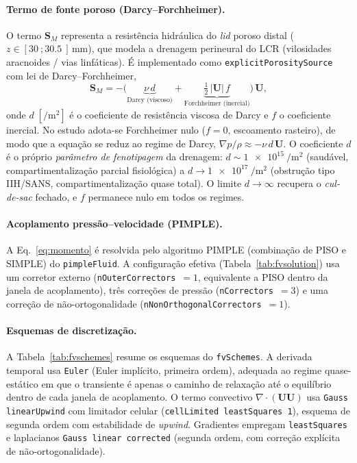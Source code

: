 \paragraph{Termo de fonte poroso (Darcy--Forchheimer).} O termo $\mathbf{S}_M$
representa a resistência hidráulica do \emph{lid} poroso distal
($z \in [\SI{30}{}; \SI{30.5}{}]\,\si{\milli\meter}$), que modela a drenagem
perineural do LCR (vilosidades aracnoides / vias linfáticas). É implementado
como \texttt{explicitPorositySource} com lei de Darcy--Forchheimer,
\begin{equation}
  \mathbf{S}_M
  = -\Big(
      \underbrace{\nu\,d}_{\text{Darcy (viscoso)}}
      + \underbrace{\tfrac{1}{2}\,|\mathbf{U}|\,f}_{\text{Forchheimer (inercial)}}
    \Big)\,\mathbf{U},
  \label{eq:darcy}
\end{equation}
onde $d\;[\si{\per\meter\squared}]$ é o coeficiente de resistência viscosa de
Darcy e $f$ o coeficiente inercial. No estudo adota-se Forchheimer nulo
($f = 0$, escoamento rasteiro), de modo que a equação se reduz ao regime de
Darcy, $\nabla p/\rho \approx -\nu\,d\,\mathbf{U}$. O coeficiente $d$ é o próprio
\emph{parâmetro de fenotipagem} da drenagem: $d \sim \SI{1e15}{\per\meter\squared}$
(saudável, compartimentalização parcial fisiológica) a
$d \to \SI{1e17}{\per\meter\squared}$ (obstrução tipo IIH/SANS,
compartimentalização quase total). O limite $d \to \infty$ recupera o
\emph{cul-de-sac} fechado, e $f$ permanece nulo em todos os regimes.

\paragraph{Acoplamento pressão--velocidade (PIMPLE).} A
Eq.~\eqref{eq:momento} é resolvida pelo algoritmo PIMPLE (combinação de PISO e
SIMPLE) do \texttt{pimpleFluid}. A configuração efetiva
(Tabela~\ref{tab:fvsolution}) usa um corretor externo
(\texttt{nOuterCorrectors}~$=1$, equivalente a PISO dentro da janela de
acoplamento), três correções de pressão (\texttt{nCorrectors}~$=3$) e uma
correção de não-ortogonalidade (\texttt{nNonOrthogonalCorrectors}~$=1$).

\paragraph{Esquemas de discretização.} A Tabela~\ref{tab:fvschemes} resume os
esquemas do \texttt{fvSchemes}. A derivada temporal usa \texttt{Euler} (Euler
implícito, primeira ordem), adequada ao regime quase-estático em que o transiente
é apenas o caminho de relaxação até o equilíbrio dentro de cada janela de
acoplamento. O termo convectivo $\nabla\!\cdot(\mathbf{U}\mathbf{U})$ usa
\texttt{Gauss linearUpwind} com limitador celular (\texttt{cellLimited
leastSquares 1}), esquema de segunda ordem com estabilidade de \emph{upwind}.
Gradientes empregam \texttt{leastSquares} e laplacianos \texttt{Gauss linear
corrected} (segunda ordem, com correção explícita de não-ortogonalidade).

